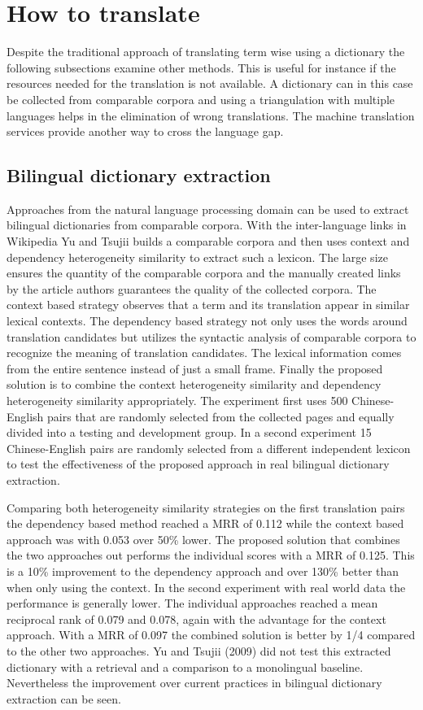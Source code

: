 \documentclass[journal]{IEEEtran}
\begin{document}
\section*{How to translate}
Despite the traditional approach of translating term wise using a dictionary the following subsections examine other methods.
This is useful for instance if the resources needed for the translation is not available.
A dictionary can in this case be collected from comparable corpora and using a triangulation with multiple languages helps in the elimination of wrong translations.
The machine translation services provide another way to cross the language gap.

\setcounter{subsection}{0}

\subsection{Bilingual dictionary extraction}
Approaches from the natural language processing domain can be used to extract bilingual dictionaries from comparable corpora.
With the inter-language links in Wikipedia Yu and Tsujii \cite{yu09} builds a comparable corpora and then uses context and dependency heterogeneity similarity to extract such a lexicon.
The large size ensures the quantity of the comparable corpora and the manually created links by the article authors guarantees the quality of the collected corpora.
The context based strategy observes that a term and its translation appear in similar lexical contexts.
The dependency based strategy not only uses the words around translation candidates but utilizes the syntactic analysis of comparable corpora to recognize the meaning of translation candidates.
The lexical information comes from the entire sentence instead of just a small frame.
Finally the proposed solution is to combine the context heterogeneity similarity and dependency heterogeneity similarity appropriately.
The experiment first uses 500 Chinese-English pairs that are randomly selected from the collected pages and equally divided into a testing and development group.
In a second experiment 15 Chinese-English pairs are randomly selected from a different independent lexicon to test the effectiveness of the proposed approach in real bilingual dictionary extraction.

Comparing both heterogeneity similarity strategies on the first translation pairs the dependency based method reached a MRR of 0.112 while the context based approach was with 0.053 over 50\% lower.
The proposed solution that combines the two approaches out performs the individual scores with a MRR of 0.125.
This is a 10\% improvement to the dependency approach and over 130\% better than when only using the context.
In the second experiment with real world data the performance is generally lower.
The individual approaches reached a mean reciprocal rank of 0.079 and 0.078, again with the advantage for the context approach.
With a MRR of 0.097 the combined solution is better by 1/4 compared to the other two approaches.
Yu and Tsujii (2009) did not test this extracted dictionary with a retrieval and a comparison to a monolingual baseline.
Nevertheless the improvement over current practices in bilingual dictionary extraction can be seen.
\end{document}
